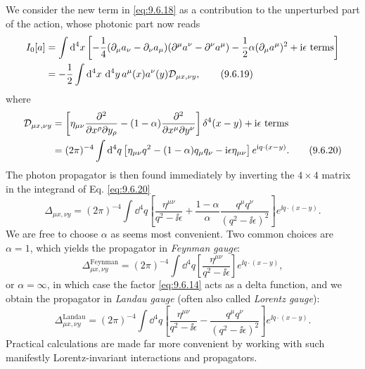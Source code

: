 We consider the new term in \eqref{eq:9.6.18} as a contribution to the unperturbed part
of the action, whose photonic part now reads
\begin{align}
I_0[a]
&=\int \mathop{}\!\mathrm{d}^4x\left[-\frac14(\partial_\mu a_\nu-\partial_\nu a_\mu)
 (\partial^\mu a^\nu-\partial^\nu a^\mu)
 -\frac12\alpha(\partial_\mu a^\mu)^2+\mathrm{i}\epsilon\text{ terms}\right]
\notag\\
&=-\frac12\int \mathop{}\!\mathrm{d}^4x\,\mathop{}\!\mathrm{d}^4y\,a^\mu(x)a^\nu(y)
 \mathcal D_{\mu x,\nu y},
\tag{9.6.19}\label{eq:9.6.19}
\end{align}
where
\begin{align}
\mathcal D_{\mu x,\nu y}
&=\left[\eta_{\mu\nu}
 \frac{\partial^2}{\partial x^\rho\partial y_\rho}
 -(1-\alpha)\frac{\partial^2}{\partial x^\mu\partial y^\nu}\right]
 \delta^4(x-y)+\mathrm{i}\epsilon\text{ terms}
\notag\\
&=(2\pi)^{-4}\int \mathop{}\!\mathrm{d}^4q\left[
 \eta_{\mu\nu}q^2-(1-\alpha)q_\mu q_\nu-\mathrm{i}\epsilon\eta_{\mu\nu}\right]
 e^{\mathrm{i} q\cdot(x-y)}.
\tag{9.6.20}\label{eq:9.6.20}
\end{align}
The photon propagator is then found immediately by inverting the $4\times4$
matrix in the integrand of Eq. \eqref{eq:9.6.20}
\begin{equation}
\Delta_{\mu x,\nu y}=(2\pi)^{-4}\int \dd^4q\left[
 \frac{\eta^{\mu\nu}}{q^2-\ii\epsilon}
 +\frac{1-\alpha}{\alpha}\frac{q^\mu q^\nu}{(q^2-\ii\epsilon)^2}\right]
 e^{\ii q\cdot(x-y)}.
\tag{9.6.21}\label{eq:9.6.21}
\end{equation}
We are free to choose $\alpha$ as seems most convenient. Two common choices
are $\alpha=1$, which yields the propagator in \emph{Feynman gauge}:
\begin{equation}
\Delta^{\mathrm{Feynman}}_{\mu x,\nu y}
=(2\pi)^{-4}\int \dd^4q\left[\frac{\eta^{\mu\nu}}{q^2-\ii\epsilon}\right]
 e^{\ii q\cdot(x-y)},
\tag{9.6.22}\label{eq:9.6.22}
\end{equation}
or $\alpha=\infty$, in which case the factor \eqref{eq:9.6.14} acts as a delta function,
and we obtain the propagator in \emph{Landau gauge} (often also called
\emph{Lorentz gauge}):
\begin{equation}
\Delta^{\mathrm{Landau}}_{\mu x,\nu y}
=(2\pi)^{-4}\int \dd^4q\left[
 \frac{\eta^{\mu\nu}}{q^2-\ii\epsilon}
 -\frac{q^\mu q^\nu}{(q^2-\ii\epsilon)^2}\right]e^{\ii q\cdot(x-y)}.
\tag{9.6.23}\label{eq:9.6.23}
\end{equation}
Practical calculations are made far more convenient by working with such
manifestly Lorentz-invariant interactions and propagators.
